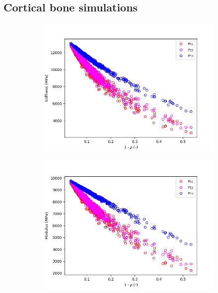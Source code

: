 \documentclass[a4paper,fleqn]{DC_ArtStyle}
\begin{document}
	\subsection{Cortical bone simulations}
	\begin{figure}
		\begin{subfigure}[b]{0.45\linewidth}
			\includegraphics[width=\linewidth]{LambdaiiStiffness_Isotropic}
		\end{subfigure}
		\begin{subfigure}[b]{0.45\linewidth}
			\includegraphics[width=\linewidth]{LambdaiiModulus_Isotropic}
		\end{subfigure}
		\begin{subfigure}[b]{0.45\linewidth}

\end{subfigure}
\end{figure}
\end{document}
